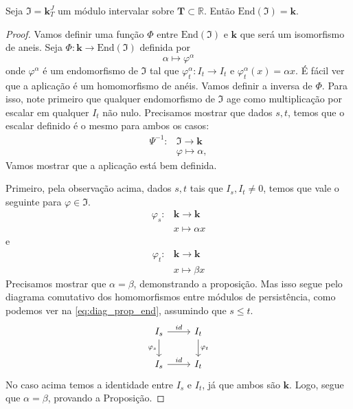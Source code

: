 \begin{propo}
    Seja $\mathfrak{I} = \mathbf{k}^J_T$ um módulo intervalar sobre $\mathbf{T} \subset \mathbb{R}$. 
    Então $\text{End}(\mathfrak{I}) = \mathbf{k}$. 
\end{propo}
\begin{proof}
    Vamos definir uma função $\Phi$ entre $\text{End}(\mathfrak{I})$ e $\mathbf{k}$ que será um isomorfismo
    de aneis.
    Seja $\Phi \colon \mathbf{k} \to \text{End}(\mathfrak{I})$ definida por 
    \begin{equation*}
        \alpha \mapsto \varphi^{\alpha}
    \end{equation*}
    onde $\varphi^\alpha$ é um endomorfismo de $\mathfrak{I}$ tal que $\varphi_t^{\alpha} \colon I_t 
    \to I_t$ e $\varphi^{\alpha}_t (x) = \alpha x$. É fácil ver que a aplicação é um homomorfismo de anéis.
    Vamos definir a inversa de $\Phi$. Para isso, note primeiro que qualquer endomorfismo de $\mathfrak{I}$
    age como multiplicação por escalar em qualquer $I_t$ não nulo. Precisamos mostrar que dados $s,t$, temos 
    que o escalar definido é o mesmo para ambos os casos:
    \begin{align*}
        \Psi^{-1} \colon & \mathfrak{I} \to \mathbf{k} \\
                         & \varphi \mapsto \alpha,
    \end{align*}
    Vamos mostrar que a aplicação está bem definida.
    
    Primeiro, pela observação acima, dados $s,t$ tais que $I_s, I_t \neq 0$, temos que vale o seguinte
    para $\varphi \in \mathfrak{I}$.
    \begin{align*}
        \varphi_s \colon & \mathbf{k} \to \mathbf{k} \\
                         &     x \mapsto \alpha x 
    \end{align*}
    e 
    \begin{align*}
        \varphi_t \colon & \mathbf{k} \to \mathbf{k} \\
                         &     x \mapsto \beta x 
    \end{align*}
    Precisamos mostrar que $\alpha = \beta$, demonstrando a proposição. Mas isso segue pelo 
    diagrama comutativo dos homomorfismos entre módulos de persistência, como podemos ver na 
    \eqref{eq:diag_prop_end}, assumindo que $s \leq t$. 
    \begin{equation}
        \label{eq:diag_prop_end}
        \begin{tikzcd}
            I_s \arrow{d}[swap]{\varphi_s} \arrow{r}{id} & I_t \arrow{d}{\varphi_t} \\
            I_s \arrow{r}{id}                     & I_t                    
        \end{tikzcd} 
    \end{equation}
    No caso acima temos a identidade entre $I_s$ e $I_t$, já que ambos são $\mathbf{k}$. Logo,
    segue que $\alpha=\beta$, provando a Proposição.
\end{proof}

